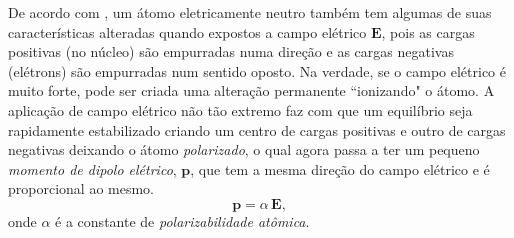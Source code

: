 De acordo com \cite{griffiths}, um átomo eletricamente neutro também tem algumas de suas características alteradas quando expostos a campo elétrico $\mathbf{E}$, pois as cargas positivas (no núcleo) são empurradas numa direção e as cargas negativas (elétrons) são empurradas num sentido oposto. Na verdade, se o campo elétrico é muito forte, pode ser criada uma alteração permanente ``ionizando" o átomo. A aplicação de campo elétrico não tão extremo faz com que um equilíbrio seja rapidamente estabilizado criando um centro de cargas positivas e outro de cargas negativas deixando o átomo \textit{polarizado}, o qual agora passa a ter um pequeno \textit{momento de dipolo elétrico}, $\mathbf{p}$, que tem a mesma direção do campo elétrico e é proporcional ao mesmo.
\begin{equation*}
\mathbf{p}=\alpha\,\mathbf{E},
\end{equation*}
onde $\alpha$ é a constante de \textit{polarizabilidade atômica}. 

